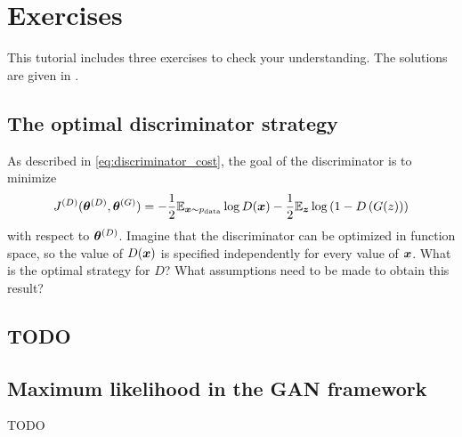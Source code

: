 \section{Exercises}

This tutorial includes three exercises to check your understanding.
The solutions are given in .

\subsection{The optimal discriminator strategy}
\label{sec:opt_d}

As described in \eqref{eq:discriminator_cost}, the goal of the discriminator is to minimize
\begin{equation}
  J^{(D)}({\bm{\theta}}^{(D)}, {\bm{\theta}}^{(G)}) = -\frac{1}{2} \mathbb{E}_{{\bm{x}} \sim p_{\rm{data}}} \log D({\bm{x}}) - \frac{1}{2} \mathbb{E}_{{\bm{z}}} \log \left(1 - D\left( G(z) \right) \right)
\end{equation}
with respect to ${\bm{\theta}}^{(D)}$.
Imagine that the discriminator can be optimized in function space, so the value of
$D({\bm{x}})$ is specified independently for every value of ${\bm{x}}$.
What is the optimal strategy for $D$?
What assumptions need to be made to obtain this result?

\subsection{TODO}

\subsection{Maximum likelihood in the GAN framework}
\label{sec:mle_exercise}
TODO
